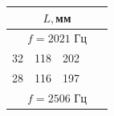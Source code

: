 \documentclass[12pt,a4paper]{article}
\begin{document}
\begin{enumerate}
\begin{enumerate}
		\begin{tabular}{|c|c|c|c|c} \hline
			\multicolumn{5}{|c|}{$L, $мм} \\ \hline
			\multicolumn{5}{|c|}{$f = 2021$ Гц} \\ \hline
			32 & 118 & 202 \\ \hline
			28 & 116 & 197 \\ \hline
			\multicolumn{5}{|c|}{$f = 2506$ Гц} \\ \hline	
		\end{tabular}
		\end{enumerate}
	\end{enumerate}
\end{document}

